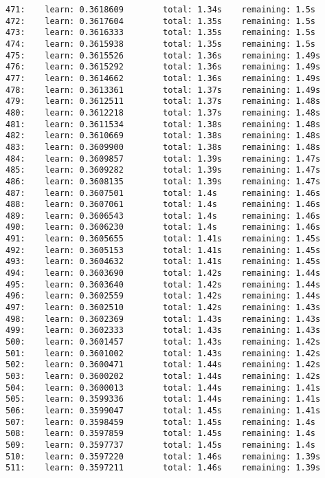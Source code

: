 \documentclass[11pt]{article}
\begin{document}
\begin{Verbatim}[commandchars=\\\{\}]
471:    learn: 0.3618609        total: 1.34s    remaining: 1.5s
472:    learn: 0.3617604        total: 1.35s    remaining: 1.5s
473:    learn: 0.3616333        total: 1.35s    remaining: 1.5s
474:    learn: 0.3615938        total: 1.35s    remaining: 1.5s
475:    learn: 0.3615526        total: 1.36s    remaining: 1.49s
476:    learn: 0.3615292        total: 1.36s    remaining: 1.49s
477:    learn: 0.3614662        total: 1.36s    remaining: 1.49s
478:    learn: 0.3613361        total: 1.37s    remaining: 1.49s
479:    learn: 0.3612511        total: 1.37s    remaining: 1.48s
480:    learn: 0.3612218        total: 1.37s    remaining: 1.48s
481:    learn: 0.3611534        total: 1.38s    remaining: 1.48s
482:    learn: 0.3610669        total: 1.38s    remaining: 1.48s
483:    learn: 0.3609900        total: 1.38s    remaining: 1.48s
484:    learn: 0.3609857        total: 1.39s    remaining: 1.47s
485:    learn: 0.3609282        total: 1.39s    remaining: 1.47s
486:    learn: 0.3608135        total: 1.39s    remaining: 1.47s
487:    learn: 0.3607501        total: 1.4s     remaining: 1.46s
488:    learn: 0.3607061        total: 1.4s     remaining: 1.46s
489:    learn: 0.3606543        total: 1.4s     remaining: 1.46s
490:    learn: 0.3606230        total: 1.4s     remaining: 1.46s
491:    learn: 0.3605655        total: 1.41s    remaining: 1.45s
492:    learn: 0.3605153        total: 1.41s    remaining: 1.45s
493:    learn: 0.3604632        total: 1.41s    remaining: 1.45s
494:    learn: 0.3603690        total: 1.42s    remaining: 1.44s
495:    learn: 0.3603640        total: 1.42s    remaining: 1.44s
496:    learn: 0.3602559        total: 1.42s    remaining: 1.44s
497:    learn: 0.3602510        total: 1.42s    remaining: 1.43s
498:    learn: 0.3602369        total: 1.43s    remaining: 1.43s
499:    learn: 0.3602333        total: 1.43s    remaining: 1.43s
500:    learn: 0.3601457        total: 1.43s    remaining: 1.42s
501:    learn: 0.3601002        total: 1.43s    remaining: 1.42s
502:    learn: 0.3600471        total: 1.44s    remaining: 1.42s
503:    learn: 0.3600202        total: 1.44s    remaining: 1.42s
504:    learn: 0.3600013        total: 1.44s    remaining: 1.41s
505:    learn: 0.3599336        total: 1.44s    remaining: 1.41s
506:    learn: 0.3599047        total: 1.45s    remaining: 1.41s
507:    learn: 0.3598459        total: 1.45s    remaining: 1.4s
508:    learn: 0.3597859        total: 1.45s    remaining: 1.4s
509:    learn: 0.3597737        total: 1.45s    remaining: 1.4s
510:    learn: 0.3597220        total: 1.46s    remaining: 1.39s
511:    learn: 0.3597211        total: 1.46s    remaining: 1.39s

\end{Verbatim}
\end{document}
